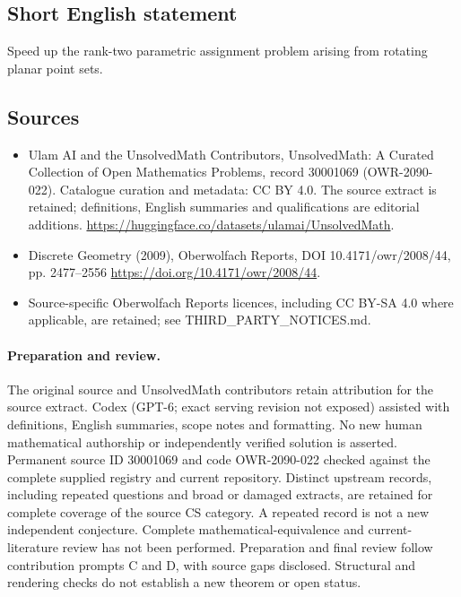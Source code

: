 \documentclass[11pt]{article}
\begin{document}
\subsection{Short English statement}
Speed up the rank-two parametric assignment problem arising from rotating planar point sets.
\subsection{Sources}
\begin{itemize}
\item[\hypertarget{source:30001069:1}{S1}] Ulam AI and the UnsolvedMath Contributors, UnsolvedMath: A Curated Collection of Open Mathematics Problems, record 30001069 (OWR-2090-022). Catalogue curation and metadata: CC BY 4.0. The source extract is retained; definitions, English summaries and qualifications are editorial additions.
\url{https://huggingface.co/datasets/ulamai/UnsolvedMath}.
\item[\hypertarget{source:30001069:2}{S2}] Discrete Geometry (2009), Oberwolfach Reports, DOI 10.4171/owr/2008/44, pp. 2477--2556
\url{https://doi.org/10.4171/owr/2008/44}.
\item Source-specific Oberwolfach Reports licences, including CC BY-SA 4.0 where applicable, are retained; see THIRD\_PARTY\_NOTICES.md.
\end{itemize}
\paragraph{Preparation and review.}
The original source and UnsolvedMath contributors retain attribution for the source extract. Codex (GPT-6; exact serving revision not exposed) assisted with definitions, English summaries, scope notes and formatting. No new human mathematical authorship or independently verified solution is asserted. Permanent source ID 30001069 and code OWR-2090-022 checked against the complete supplied registry and current repository. Distinct upstream records, including repeated questions and broad or damaged extracts, are retained for complete coverage of the source CS category. A repeated record is not a new independent conjecture. Complete mathematical-equivalence and current-literature review has not been performed. Preparation and final review follow contribution prompts C and D, with source gaps disclosed. Structural and rendering checks do not establish a new theorem or open status.
\label{end:30001069}
\end{document}
